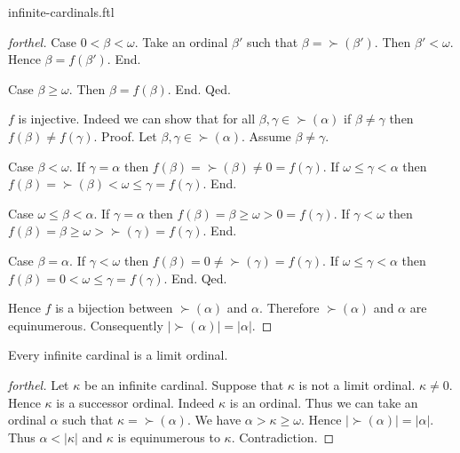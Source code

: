 \documentclass{naproche-library}
\begin{document}
\begin{smodule}[title=Infinite Cardinal Numbers]{infinite-cardinals.ftl}
\begin{proof}[forthel]
    Case $0 < \beta < \omega$.
      Take an ordinal $\beta'$ such that $\beta = \succ(\beta')$.
      Then $\beta' < \omega$.
      Hence $\beta = f(\beta')$.
    End.

    Case $\beta \geq \omega$.
      Then $\beta = f(\beta)$.
    End.
  Qed.

  $f$ is injective.
  Indeed we can show that for all $\beta, \gamma \in \succ(\alpha)$ if
  $\beta \neq \gamma$ then $f(\beta) \neq f(\gamma)$. \newline
  Proof.
    Let $\beta, \gamma \in \succ(\alpha)$.
    Assume $\beta \neq \gamma$.

    Case $\beta < \omega$.
      If $\gamma = \alpha$ then
      $f(\beta)
        = \succ(\beta)
        \neq 0
        = f(\gamma)$.
      If $\omega \leq \gamma < \alpha$ then
      $f(\beta)
        = \succ(\beta)
        < \omega
        \leq \gamma
        = f(\gamma)$.
    End.

    Case $\omega \leq \beta < \alpha$.
      If $\gamma = \alpha$ then
      $f(\beta)
        = \beta
        \geq \omega
        > 0
        = f(\gamma)$.
      If $\gamma < \omega$ then
      $f(\beta)
        = \beta
        \geq \omega
        > \succ(\gamma)
        = f(\gamma)$.
    End.

    Case $\beta = \alpha$.
      If $\gamma < \omega$ then
      $f(\beta)
        = 0
        \neq \succ(\gamma)
        = f(\gamma)$.
      If $\omega \leq \gamma < \alpha$ then
      $f(\beta)
        = 0
        < \omega
        \leq \gamma
        = f(\gamma)$.
    End.
  Qed.

  Hence $f$ is a bijection between $\succ(\alpha)$ and $\alpha$.
  Therefore $\succ(\alpha)$ and $\alpha$ are equinumerous.
  Consequently $|\succ(\alpha)| = |\alpha|$.
\end{proof}

\begin{proposition}[forthel,id=SET_THEORY_07_8700732632989696]
  Every infinite cardinal is a limit ordinal.
\end{proposition}
\begin{proof}[forthel]
  Let $\kappa$ be an infinite cardinal.
  Suppose that $\kappa$ is not a limit ordinal.
  $\kappa \neq 0$.
  Hence $\kappa$ is a successor ordinal.
  Indeed $\kappa$ is an ordinal.
  Thus we can take an ordinal $\alpha$ such that $\kappa = \succ(\alpha)$.
  We have $\alpha > \kappa \geq \omega$.
  Hence $|\succ(\alpha)| = |\alpha|$.
  Thus $\alpha < |\kappa|$ and $\kappa$ is equinumerous to $\kappa$.
  Contradiction.
\end{proof}
\end{smodule}
\end{document}
